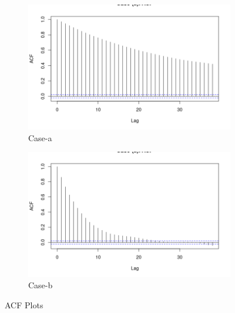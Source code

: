 \documentclass{article}
\begin{document}
\begin{figure}[ht]
\begin{subfigure}{.5\textwidth}
  \centering
  \includegraphics[width=.8\linewidth]{a3.png}  
  \caption{Case-a}
  \label{fig:sub-first}
\end{subfigure}
\begin{subfigure}{.5\textwidth}
  \centering
  \includegraphics[width=.8\linewidth]{b3.png}  
  \caption{Case-b}
  \label{fig:sub-second}
\end{subfigure}
\caption{ACF Plots}
\label{fig:fig}
\end{figure}
\end{document}
